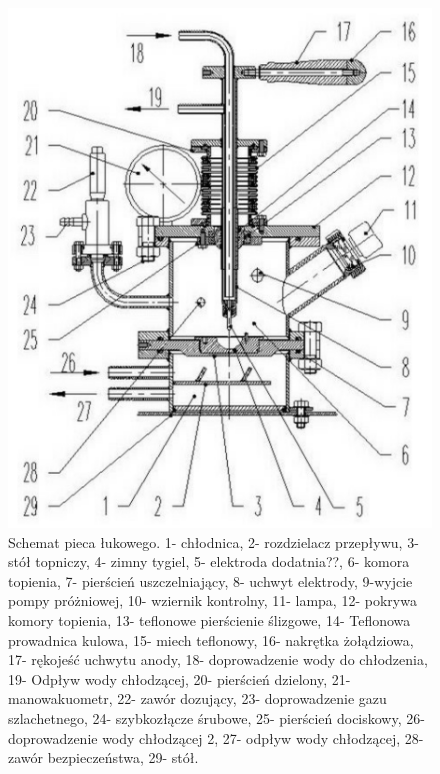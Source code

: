 \documentclass[a4paper,12pt]{article}
\numberwithin{equation}{section}
\begin{document}
\newpage
\begin{figure}[h]
\centerline{\includegraphics[scale=0.85]{../img/TCpiecschemat}}
\caption{Schemat pieca łukowego. 1- chłodnica, 2- rozdzielacz przepływu, 3- stół topniczy, 4- zimny tygiel, 5- elektroda dodatnia??, 6- komora topienia, 7- pierścień uszczelniający, 8- uchwyt elektrody, 9-wyjcie pompy próżniowej, 10- wziernik kontrolny, 11- lampa, 12- pokrywa komory topienia, 13- teflonowe pierścienie ślizgowe, 14- Teflonowa prowadnica kulowa,  15- miech teflonowy, 16- nakrętka żołądziowa, 17- rękojeść uchwytu anody, 18- doprowadzenie wody do chłodzenia, 19- Odpływ wody chłodzącej, 20- pierścień dzielony, 21- manowakuometr, 22- zawór dozujący, 23- doprowadzenie gazu szlachetnego, 24- szybkozłącze śrubowe, 25- pierścień dociskowy, 26-  doprowadzenie wody chłodzącej 2, 27- odpływ wody chłodzącej, 28- zawór bezpieczeństwa, 29- stół.}
\label{fig:schematPieca}
\end{figure}
\end{document}
